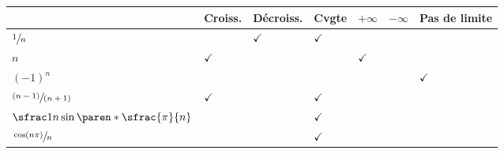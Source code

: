 \documentclass[12pt,french,oneside,a4paper]{memoir} %
\begin{document}
\begin{exo}
\begin{correction}
\begin{tabular}{lllllll}
                                             & Croiss.        & Décroiss.      & Cvgte          & \(+\infty\)    & \(-\infty\) & Pas de limite  \\
  \hline
  \(\sfrac1n\)                               &                & \(\checkmark\) & \(\checkmark\) &                &             &                \\
  \(n\)                                      & \(\checkmark\) &                &                & \(\checkmark\) &             &                \\
  \((-1)^{n}\)                               &                &                &                &                &             & \(\checkmark\) \\
  \(\sfrac{(n-1)}{(n+1)}\)                   & \(\checkmark\) &                & \(\checkmark\) &                &             &                \\
  \(\sfrac 1 n \sin\paren*{\sfrac{\pi}{n}}\) &                &                & \(\checkmark\) &                &             &                \\
  \(\sfrac{\cos(n\pi)}{n}\)                  &                &                & \(\checkmark\) &                &             &                \\
\end{tabular}
\end{correction}
\end{exo}
\end{document}
